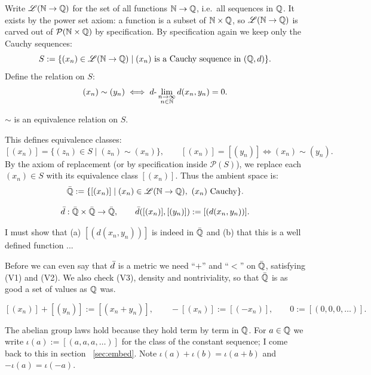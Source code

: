Write $\mathscr{L}(\mathbb{N} \to \mathbb{Q})$ for the set of all functions $\mathbb{N}\to\mathbb{Q}$, i.e.\
all sequences in $\mathbb{Q}$. It exists by the power set axiom: a function is a
subset of $\mathbb{N}\times\mathbb{Q}$, so $\mathscr{L}(\mathbb{N}\to\mathbb{Q})$ is carved out of
$\mathcal P(\mathbb{N}\times\mathbb{Q})$ by specification. By specification again we keep only
the Cauchy sequences:
\[
S := \{(x_n)\in\mathscr{L}(\mathbb{N} \to \mathbb{Q}) \mid (x_n) \text{ is a Cauchy sequence in } (\mathbb{Q},d)\}.
\]
Define the relation on $S$:
\[
(x_n) \sim (y_n)
\iff d\text{-}\lim_{\substack{n \to \infty \\ n \in \mathbb{N} }} d(x_n, y_n) = 0 .
\]

\begin{lemma} $\sim$ is an equivalence relation on $S$.
\end{lemma}

This defines equivalence classes:
\[
[(x_n)] = \{(z_n) \in S \mid (z_n) \sim (x_n)\},
\qquad
[(x_n)] = [(y_n)] \iff (x_n) \sim (y_n).
\]
By the axiom of replacement (or by specification inside $\mathcal P(S)$), we
replace each $(x_n) \in S$ with its equivalence class $[(x_n)]$. Thus the
ambient space is:
\[
\Qb :=
\{[(x_n)] \mid (x_n) \in \mathscr{L}(\N \to \Q),\ (x_n)\ \text{Cauchy}\}.
\]



\[ \bar{d}: \bar{\mathbb{Q}} \times \bar{\mathbb{Q}} \to \bar{\mathbb{Q}}, \qquad
 \bar{d}( [(x_n)] ,[(y_n)] )  :=  [(d(x_n,y_n))] . \]

I must show that (a) $[(d(x_n,y_n))] $ is indeed in $\bar{\mathbb{Q}}$ and (b) that this is a well defined function ...


Before we can even say that $\bar{d}$ is a metric we need ``$+$'' and ``$<$'' on
$\bar{\mathbb{Q}}$, satisfying (V1) and (V2). We also check (V3), density and
nontriviality, so that $\bar{\mathbb{Q}}$ is as good a set of values as $\mathbb{Q}$ was.

\[
[(x_n)]+[(y_n)] := [(x_n+y_n)],\qquad -[(x_n)] := [(-x_n)],\qquad 0:=[(0,0,0,\dots)].
\]

The abelian group laws hold because they hold term by term in $\mathbb{Q}$. For
$a\in\mathbb{Q}$ we write $\iota(a):=[(a,a,a,\dots)]$ for the class of the constant
sequence; I come back to this in section ~\ref{sec:embed}. Note
$\iota(a)+\iota(b)=\iota(a+b)$ and $-\iota(a)=\iota(-a)$.

